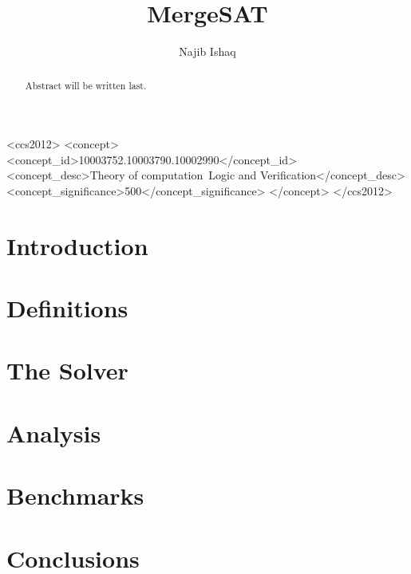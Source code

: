 \documentclass[acmsmall,authordraft]{acmart}
\begin{document}
    \title{MergeSAT}

    \author{Najib Ishaq}

    \renewcommand{\shortauthors}{Najib}

    \begin{abstract}
        Abstract will be written last.
    \end{abstract}

    \begin{CCSXML}
        <ccs2012>
            <concept>
                <concept_id>10003752.10003790.10002990</concept_id>
                <concept_desc>Theory of computation~Logic and Verification</concept_desc>
                <concept_significance>500</concept_significance>
            </concept>
        </ccs2012>
\end{CCSXML}



    \maketitle

    \section{Introduction}
    \label{sec:introduction}
    

    \section{Definitions}
    \label{sec:definitions}
    

    \section{The Solver}
    \label{sec:the-solver}
    

    \section{Analysis}
    \label{sec:analysis}
    

    \section{Benchmarks}
    \label{sec:benchmarks}
    

    \section{Conclusions}
    \label{sec:conclusions}
    

    
    
\end{document}
